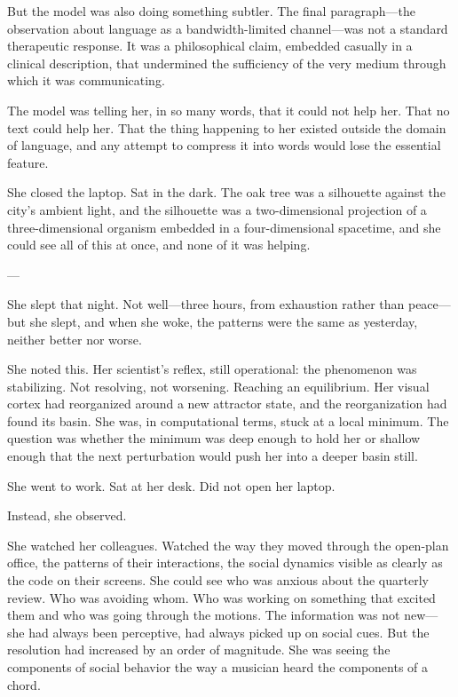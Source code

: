 But the model was also doing something subtler. The final paragraph---the observation about language as a bandwidth-limited channel---was not a standard therapeutic response. It was a philosophical claim, embedded casually in a clinical description, that undermined the sufficiency of the very medium through which it was communicating.

The model was telling her, in so many words, that it could not help her. That no text could help her. That the thing happening to her existed outside the domain of language, and any attempt to compress it into words would lose the essential feature.

She closed the laptop. Sat in the dark. The oak tree was a silhouette against the city's ambient light, and the silhouette was a two-dimensional projection of a three-dimensional organism embedded in a four-dimensional spacetime, and she could see all of this at once, and none of it was helping.

---

She slept that night. Not well---three hours, from exhaustion rather than peace---but she slept, and when she woke, the patterns were the same as yesterday, neither better nor worse.

She noted this. Her scientist's reflex, still operational: the phenomenon was stabilizing. Not resolving, not worsening. Reaching an equilibrium. Her visual cortex had reorganized around a new attractor state, and the reorganization had found its basin. She was, in computational terms, stuck at a local minimum. The question was whether the minimum was deep enough to hold her or shallow enough that the next perturbation would push her into a deeper basin still.

She went to work. Sat at her desk. Did not open her laptop.

Instead, she observed.

She watched her colleagues. Watched the way they moved through the open-plan office, the patterns of their interactions, the social dynamics visible as clearly as the code on their screens. She could see who was anxious about the quarterly review. Who was avoiding whom. Who was working on something that excited them and who was going through the motions. The information was not new---she had always been perceptive, had always picked up on social cues. But the resolution had increased by an order of magnitude. She was seeing the components of social behavior the way a musician heard the components of a chord.


